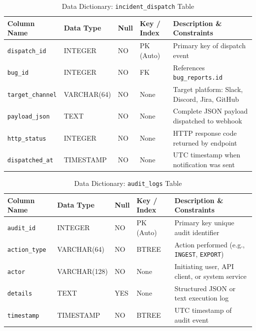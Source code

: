 \documentclass[12pt,a4paper]{article}
\begin{document}
\begin{table}[H]
\centering
\caption{Data Dictionary: \texttt{incident\_dispatch} Table}
\label{tab:dd_incident_dispatch}
\renewcommand{\arraystretch}{1.25}
\begin{tabularx}{\textwidth}{|>{\raggedright\arraybackslash}p{3.2cm}|>{\raggedright\arraybackslash}p{2.6cm}|>{\centering\arraybackslash}p{1.4cm}|>{\raggedright\arraybackslash}p{2.2cm}|>{\raggedright\arraybackslash}X|}
\hline
\textbf{Column Name} & \textbf{Data Type} & \textbf{Null} & \textbf{Key / Index} & \textbf{Description \& Constraints} \\
\hline
\texttt{dispatch\_id} & INTEGER & NO & PK (Auto) & Primary key of dispatch event \\
\hline
\texttt{bug\_id} & INTEGER & NO & FK & References \texttt{bug\_reports.id} \\
\hline
\texttt{target\_channel} & VARCHAR(64) & NO & None & Target platform: Slack, Discord, Jira, GitHub \\
\hline
\texttt{payload\_json} & TEXT & NO & None & Complete JSON payload dispatched to webhook \\
\hline
\texttt{http\_status} & INTEGER & NO & None & HTTP response code returned by endpoint \\
\hline
\texttt{dispatched\_at} & TIMESTAMP & NO & None & UTC timestamp when notification was sent \\
\hline
\end{tabularx}
\end{table}

\begin{table}[H]
\centering
\caption{Data Dictionary: \texttt{audit\_logs} Table}
\label{tab:dd_audit_logs}
\renewcommand{\arraystretch}{1.25}
\begin{tabularx}{\textwidth}{|>{\raggedright\arraybackslash}p{3.2cm}|>{\raggedright\arraybackslash}p{2.6cm}|>{\centering\arraybackslash}p{1.4cm}|>{\raggedright\arraybackslash}p{2.2cm}|>{\raggedright\arraybackslash}X|}
\hline
\textbf{Column Name} & \textbf{Data Type} & \textbf{Null} & \textbf{Key / Index} & \textbf{Description \& Constraints} \\
\hline
\texttt{audit\_id} & INTEGER & NO & PK (Auto) & Primary key unique audit identifier \\
\hline
\texttt{action\_type} & VARCHAR(64) & NO & BTREE & Action performed (e.g., \texttt{INGEST}, \texttt{EXPORT}) \\
\hline
\texttt{actor} & VARCHAR(128) & NO & None & Initiating user, API client, or system service \\
\hline
\texttt{details} & TEXT & YES & None & Structured JSON or text execution log \\
\hline
\texttt{timestamp} & TIMESTAMP & NO & BTREE & UTC timestamp of audit event \\
\hline
\end{tabularx}
\end{table}
\end{document}
